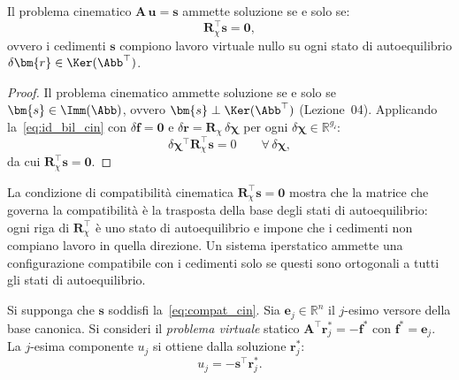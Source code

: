 \begin{corollario}
	\label{cor:compat_cin}
	Il problema cinematico $\bm{A}\,\bm{u} = \bm{s}$
	ammette soluzione se e solo se:
	\begin{equation}\label{eq:compat_cin}
		\bm{R}_\chi^{\top}\bm{s} = \bm{0},
	\end{equation}
	ovvero i cedimenti $\bm{s}$ compiono lavoro virtuale
	nullo su ogni stato di autoequilibrio
	$\delta\bm{r} \in \Ker(\Abb^{\top})$.
\end{corollario}

\begin{proof}
	Il problema cinematico ammette soluzione se e solo se
	$\bm{s} \in \Imm(\Abb)$, ovvero $\bm{s} \perp
	\Ker(\Abb^{\top})$ (Lezione~04). Applicando
	la~\eqref{eq:id_bil_cin} con $\delta\bm{f} = \bm{0}$
	e $\delta\bm{r} = \bm{R}_\chi\,\delta\bm{\chi}$ per ogni
	$\delta\bm{\chi} \in \mathbb{R}^{g_{\mathscr{i}}}$:
	\begin{equation}
		\delta\bm{\chi}^{\top}\bm{R}_\chi^{\top}\bm{s} = 0
		\qquad \forall\,\delta\bm{\chi},
	\end{equation}
	da cui $\bm{R}_\chi^{\top}\bm{s} = \bm{0}$.
\end{proof}

\begin{oss}
	La condizione di compatibilità cinematica
	$\bm{R}_\chi^{\top}\bm{s} = \bm{0}$ mostra che la
	matrice che governa la compatibilità è la trasposta
	della base degli stati di autoequilibrio: ogni riga
	di $\bm{R}_\chi^{\top}$ è uno stato di autoequilibrio
	e impone che i cedimenti non compiano lavoro in quella
	direzione. Un sistema iperstatico ammette una
	configurazione compatibile con i cedimenti solo se
	questi sono ortogonali a tutti gli stati di
	autoequilibrio.
\end{oss}

\begin{corollario}
	\label{cor:carico_unitario}
	Si supponga che $\bm{s}$ soddisfi
	la~\eqref{eq:compat_cin}. Sia $\bm{e}_j \in
	\mathbb{R}^n$ il $j$-esimo versore della base canonica.
	Si consideri il \emph{problema virtuale} statico
	$\bm{A}^{\top}\bm{r}^*_j = -\bm{f}^*$ con
	$\bm{f}^* = \bm{e}_j$. La $j$-esima componente
	$u_j$ si ottiene dalla soluzione $\bm{r}^*_j$:
	\begin{equation}\label{eq:carico_unitario}
		u_j = -\bm{s}^{\top}\bm{r}^*_j.
	\end{equation}
\end{corollario}


